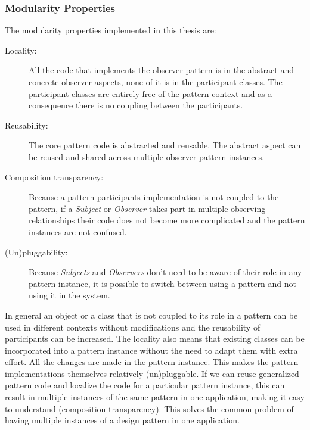 \subsubsection{Modularity Properties}\label{Modularity Properties}
The modularity properties implemented in this thesis are\cite{hannemann2002design}:

\begin{description}
	\item [Locality:] All the code that implements the observer pattern is in the abstract and concrete observer aspects, none of it is in the participant classes. 
	The participant classes are entirely free of the pattern context and as a consequence there is no coupling between the participants.

	\item [Reusability:] The core pattern code is abstracted and reusable. 
	The abstract aspect can be reused and shared across multiple observer pattern instances.

	\item [Composition transparency:] Because a pattern participants implementation is not coupled to the pattern, if a \textit{Subject} or \textit{Observer} takes part in multiple observing relationships their code does not become more complicated and the pattern instances are not confused. 

	\item [(Un)pluggability:] Because \textit{Subjects} and \textit{Observers} don't need to be aware of their role in any pattern instance, it is possible to switch between using a pattern and not using it in the system. 
\end{description}

In general an object or a class that is not coupled to its role in a pattern can be used in different contexts without modifications and the reusability of participants can be increased. 
The locality also means that existing classes can be incorporated into a pattern instance without the need to adapt them with extra effort. All the changes are made in the pattern instance. 
This makes the pattern implementations themselves relatively (un)pluggable. 
If we can reuse generalized pattern code and localize the code for a particular pattern instance, this can result in multiple instances of the same pattern in one application, making it easy to understand (composition transparency). 
This solves the common problem of having multiple instances of a design pattern in one application.

